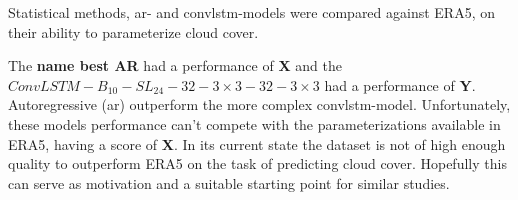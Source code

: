 Statistical methods, \acrfull{ar}- and \acrfull{convlstm}-models were compared against ERA5, on their ability to parameterize cloud cover.

The \textbf{name best AR} had a performance of \textbf{X} and the $ConvLSTM-B_{10}-SL_{24}-32-3\times3-32-3 \times3$ had a performance of \textbf{Y}. Autoregressive (\acrshort{ar}) outperform the more complex  \acrshort{convlstm}-model. Unfortunately, these models performance can't compete with the parameterizations available in ERA5, having a score of \textbf{X}. 
In its current state the dataset is not of high enough quality to outperform ERA5 on the task of predicting cloud cover. Hopefully this can serve as motivation and a suitable starting point for similar studies. 


\cleardoublepage